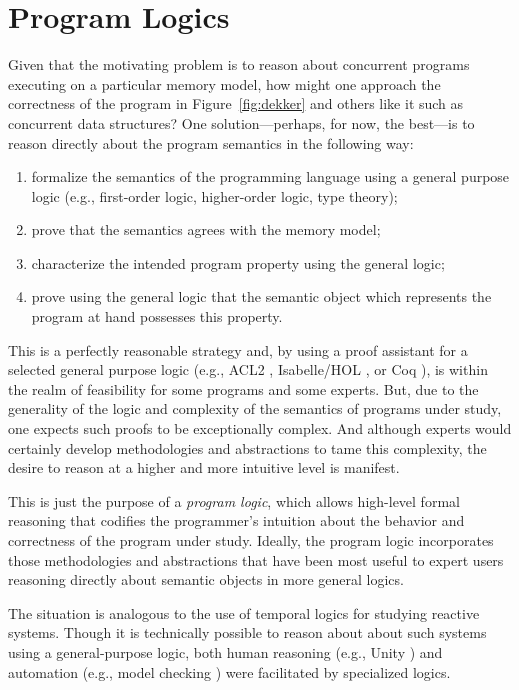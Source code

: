 \documentclass[11pt]{report}
\begin{document}
\section{Program Logics}
\label{sec:program-logics}

Given that the motivating problem is to reason about concurrent programs executing on a particular memory model, how might one approach the correctness of the program in Figure~\ref{fig:dekker} and others like it such as concurrent data structures? One solution---perhaps, for now, the best---is to reason directly about the program semantics in the following way:
\begin{enumerate}
\item formalize the semantics of the programming language using a general purpose logic (e.g., first-order logic, higher-order logic, type theory);

\item prove that the semantics agrees with the memory model;

\item characterize the intended program property using the general logic; 

\item prove using the general logic that the semantic object which represents the program at hand possesses this property.
\end{enumerate} 
This is a perfectly reasonable strategy and, by using a proof assistant for a selected general purpose logic (e.g., ACL2 \cite{DBLP:journals/tse/KaufmannM97}, Isabelle/HOL \cite{DBLP:books/sp/NipkowPW02}, or Coq \cite{CoqBook}), is within the realm of feasibility for some programs and some experts. But, due to the generality of the logic and complexity of the semantics of programs under study, one expects such proofs to be exceptionally complex. And although experts would certainly develop methodologies and abstractions to tame this complexity, the desire to reason at a higher and more intuitive level is manifest.

This is just the purpose of a \emph{program logic}, which allows high-level formal reasoning that codifies the programmer's intuition about the behavior and correctness of the program under study. Ideally, the program logic incorporates those methodologies and abstractions that have been most useful to expert users reasoning directly about semantic objects in more general logics.

The situation is analogous to the use of temporal logics for studying reactive systems. Though it is technically possible to reason about about such systems using a general-purpose logic, both human reasoning (e.g., Unity \cite{unity-book}) and automation (e.g., model checking \cite{model-checking}) were facilitated by specialized logics.
\end{document}
